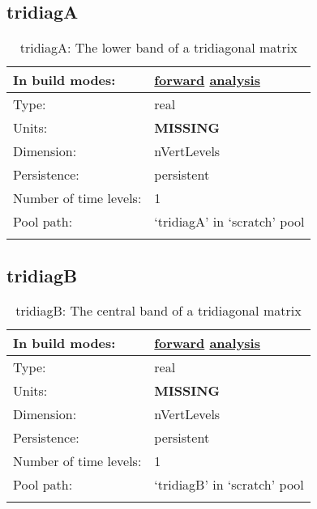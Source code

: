 \subsection[tridiagA]{tridiagA}
\label{subsec:var_sec_scratch_tridiagA}
\begin{center}
\begin{longtable}{| p{2.0in} | p{4.0in} |}
        \hline 
        In build modes: & \hyperref[subsec:forward_var_tab_scratch]{forward} \hyperref[subsec:analysis_var_tab_scratch]{analysis} \\
        \hline 
        Type: & real \\
        \hline 
        Units: & {\bf \color{red} MISSING} \\
        \hline 
        Dimension: & nVertLevels \\
        \hline 
        Persistence: & persistent \\
        \hline 
        Number of time levels: & 1 \\
        \hline 
            Pool path: & `tridiagA' in `scratch' pool \\
		 \hline 
    \caption{tridiagA: The lower band of a tridiagonal matrix}
\end{longtable}
\end{center}
\subsection[tridiagB]{tridiagB}
\label{subsec:var_sec_scratch_tridiagB}
\begin{center}
\begin{longtable}{| p{2.0in} | p{4.0in} |}
        \hline 
        In build modes: & \hyperref[subsec:forward_var_tab_scratch]{forward} \hyperref[subsec:analysis_var_tab_scratch]{analysis} \\
        \hline 
        Type: & real \\
        \hline 
        Units: & {\bf \color{red} MISSING} \\
        \hline 
        Dimension: & nVertLevels \\
        \hline 
        Persistence: & persistent \\
        \hline 
        Number of time levels: & 1 \\
        \hline 
            Pool path: & `tridiagB' in `scratch' pool \\
		 \hline 
    \caption{tridiagB: The central band of a tridiagonal matrix}
\end{longtable}
\end{center}
